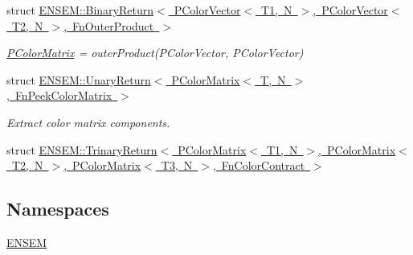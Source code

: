 \begin{DoxyCompactItemize}
\item 
struct \mbox{\hyperlink{structENSEM_1_1BinaryReturn_3_01PColorVector_3_01T1_00_01N_01_4_00_01PColorVector_3_01T2_00_01N_01_4_00_01FnOuterProduct_01_4}{E\+N\+S\+E\+M\+::\+Binary\+Return$<$ P\+Color\+Vector$<$ T1, N $>$, P\+Color\+Vector$<$ T2, N $>$, Fn\+Outer\+Product $>$}}
\begin{DoxyCompactList}\small\item\em \mbox{\hyperlink{classENSEM_1_1PColorMatrix}{P\+Color\+Matrix}} = outer\+Product(\+P\+Color\+Vector, P\+Color\+Vector) \end{DoxyCompactList}\item 
struct \mbox{\hyperlink{structENSEM_1_1UnaryReturn_3_01PColorMatrix_3_01T_00_01N_01_4_00_01FnPeekColorMatrix_01_4}{E\+N\+S\+E\+M\+::\+Unary\+Return$<$ P\+Color\+Matrix$<$ T, N $>$, Fn\+Peek\+Color\+Matrix $>$}}
\begin{DoxyCompactList}\small\item\em Extract color matrix components. \end{DoxyCompactList}\item 
struct \mbox{\hyperlink{structENSEM_1_1TrinaryReturn_3_01PColorMatrix_3_01T1_00_01N_01_4_00_01PColorMatrix_3_01T2_00_01N1d3d49ae4a9604208f2204d046c31000}{E\+N\+S\+E\+M\+::\+Trinary\+Return$<$ P\+Color\+Matrix$<$ T1, N $>$, P\+Color\+Matrix$<$ T2, N $>$, P\+Color\+Matrix$<$ T3, N $>$, Fn\+Color\+Contract $>$}}
\end{DoxyCompactItemize}
\subsection*{Namespaces}
\begin{DoxyCompactItemize}
\item 
 \mbox{\hyperlink{namespaceENSEM}{E\+N\+S\+EM}}
\end{DoxyCompactItemize}

